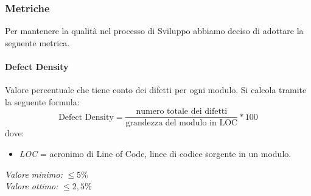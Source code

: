 \subsubsection{Metriche}
Per mantenere la qualità nel processo di Sviluppo abbiamo deciso di adottare la seguente metrica.
\paragraph{Defect Density}
Valore percentuale che tiene conto dei difetti per ogni modulo.
Si calcola tramite la seguente formula:\\
\begin{equation*}
\text{Defect Density}=\frac{\text{numero totale dei difetti}}{\text{grandezza del modulo in LOC}}*100
\end{equation*}
dove:
\begin{itemize}
\item \textit{LOC} = acronimo di Line of Code, linee di codice sorgente in un modulo.
\end{itemize}
\textit{Valore minimo:} $\le 5\%$\\
\textit{Valore ottimo:} $\le 2,5\%$